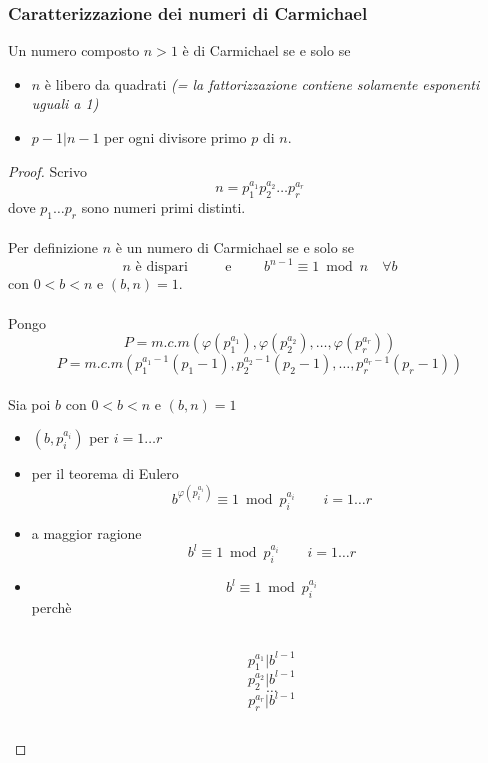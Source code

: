 \documentclass[a4paper,12pt, oneside]{book}
\begin{document}
\subsubsection[Caratterizzazione]{Caratterizzazione dei numeri di Carmichael}
Un numero composto $n>1$ è di Carmichael se e solo se
\begin{itemize}
	\item $n$ è libero da quadrati \textit{(= la fattorizzazione contiene solamente esponenti uguali a 1)}
	\item $p-1|n-1$ per ogni divisore primo $p$ di $n$.
\end{itemize}

\begin{proof}
	Scrivo $$n = p_{1}^{a_1} p_{2}^{a_2} \dots p_{r}^{a_r}$$
	dove $p_1 \dots p_r$ sono numeri primi distinti.\\\\
	Per definizione $n$ è un numero di Carmichael se e solo se
	$$n\mbox{ è dispari } \qquad \mbox{ e } \qquad b^{n-1} \equiv 1 \bmod n \quad \forall b $$
	con $0<b<n$ e $(b,n)=1$.\\\\
	Pongo
	$$P = m.c.m( \varphi(p_{1}^{a_1}), \varphi(p_{2}^{a_2}), \dots, \varphi(p_{r}^{a_r}) )$$
	$$P = m.c.m( p_{1}^{a_{1}-1}(p_{1}-1), p_{2}^{a_{2}-1}(p_{2}-1), \dots, p_{r}^{a_{r}-1}(p_{r}-1) )$$\\
	Sia poi $b$ con $0<b<n$ e $(b,n)=1$
	\begin{itemize}
		\item $(b, p_{i}^{a_i})$ per $i = 1 \dots r$
		\item per il teorema di Eulero $$b^{\varphi(p_{i}^{a_i})} \equiv 1 \bmod p_{i}^{a_i} \qquad i=1 \dots r$$
		\item a maggior ragione $$b^{l} \equiv 1 \bmod p_{i}^{a_i} \qquad i=1 \dots r$$
		\item $$b^{l} \equiv 1 \bmod p_{i}^{a_i}$$ perchè\\\\

		      \begin{minipage}{0.45\textwidth}

			      $$p_{1}^{a_1} | b^{l-1}$$
			      $$p_{2}^{a_2} | b^{l-1}$$
			      $$\dots$$
			      $$p_{r}^{a_r} | b^{l-1}$$

		      \end{minipage}%
		      \hfill
		      \begin{minipage}{0.45\textwidth}
			      \begin{tabular}{|p{\textwidth}}


\end{tabular}
\end{minipage}
\end{itemize}
\end{proof}
\end{document}

